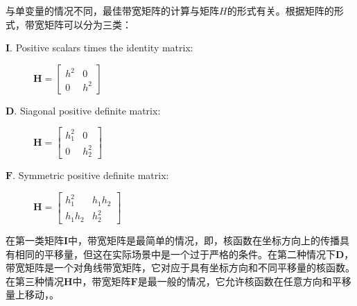 与单变量的情况不同，最佳带宽矩阵的计算与矩阵$H$的形式有关。根据矩阵的形式，带宽矩阵可以分为三类：
\begin{description}
  \item[$\mathbf{I}$. Positive scalars times the identity matrix:] $\mathbf{H} =
            \begin{bmatrix}
            h^{2} & 0\\
            0 & h^{2}
            \end{bmatrix}$

  \item[$\mathbf{D}$.  Siagonal positive definite matrix:] $\mathbf{H} =
            \begin{bmatrix}
            h_{1}^{2} & 0\\
            0 & h_{2}^{2}
            \end{bmatrix}$
  \item[$\mathbf{F}$.  Symmetric positive definite matrix:] $\mathbf{H} =
            \begin{bmatrix}
            h_{1}^{2} & h_{1}h_{2}\\
            h_{1}h_{2} & h_{2}^{2}
            \end{bmatrix}$
\end{description}
在第一类矩阵$\mathbf{I}$中，带宽矩阵是最简单的情况，即，核函数在坐标方向上的传播具有相同的平移量，但这在实际场景中是一个过于严格的条件。在第二种情况下$\mathbf{D}$，带宽矩阵是一个对角线带宽矩阵，它对应于具有坐标方向和不同平移量的核函数。在第三种情况$\mathbf{H}$中，带宽矩阵$\mathbf{F}$是最一般的情况，它允许核函数在任意方向和平移量上移动，\cite{3_22}。

